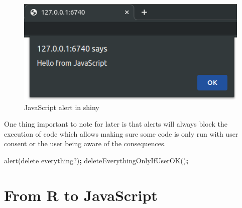\documentclass[
]{krantz}
\makeatletter
\newenvironment{Shaded}{\begin{snugshade}}{\end{snugshade}}
\newcommand{\AttributeTok}[1]{\textcolor[rgb]{0.61,0.61,0.61}{#1}}
\newcommand{\ControlFlowTok}[1]{\textcolor[rgb]{0.27,0.27,0.27}{\textbf{#1}}}
\newcommand{\KeywordTok}[1]{\textcolor[rgb]{0.27,0.27,0.27}{\textbf{#1}}}
\newcommand{\NormalTok}[1]{#1}
\newcommand{\OperatorTok}[1]{\textcolor[rgb]{0.43,0.43,0.43}{\textbf{#1}}}
\newcommand{\StringTok}[1]{\textcolor[rgb]{0.5,0.5,0.5}{#1}}
\newenvironment{kframe}{%
\medskip{}
\setlength{\fboxsep}{.8em}
 \def\at@end@of@kframe{}%
 \ifinner\ifhmode%
  \def\at@end@of@kframe{\end{minipage}}%
  \begin{minipage}{\columnwidth}%
 \fi\fi%
 \def\FrameCommand##1{\hskip\@totalleftmargin \hskip-\fboxsep
 \colorbox{shadecolor}{##1}\hskip-\fboxsep
     \hskip-\linewidth \hskip-\@totalleftmargin \hskip\columnwidth}%
 \MakeFramed {\advance\hsize-\width
   \@totalleftmargin\z@ \linewidth\hsize
   \@setminipage}}%
 {\par\unskip\endMakeFramed%
 \at@end@of@kframe}
\renewenvironment{Shaded}{\begin{kframe}}{\end{kframe}}
\makeatother
\begin{document}
\begin{Shaded}
\end{Shaded}

\begin{figure}
\centering
\includegraphics{images/alert.png}
\caption{JavaScript alert in shiny}
\end{figure}

One thing important to note for later is that alerts will always block the execution of code which allows making sure some code is only run with user consent or the user being aware of the consequences.

\begin{Shaded}
\begin{Highlighting}[]
\AttributeTok{alert}\NormalTok{(}\StringTok{\textquotesingle{}delete everything?\textquotesingle{}}\NormalTok{)}\OperatorTok{;}
\AttributeTok{deleteEverythingOnlyIfUserOK}\NormalTok{()}\OperatorTok{;}
\end{Highlighting}
\end{Shaded}

\hypertarget{from-r-to-javascript}{%
\section*{From R to JavaScript}\label{from-r-to-javascript}}
\end{document}
